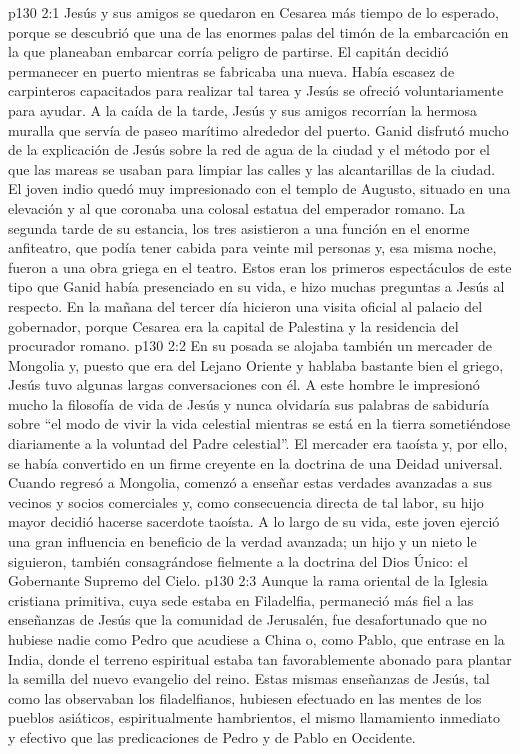 \vs p130 2:1 Jesús y sus amigos se quedaron en Cesarea más tiempo de lo esperado, porque se descubrió que una de las enormes palas del timón de la embarcación en la que planeaban embarcar corría peligro de partirse. El capitán decidió permanecer en puerto mientras se fabricaba una nueva. Había escasez de carpinteros capacitados para realizar tal tarea y Jesús se ofreció voluntariamente para ayudar. A la caída de la tarde, Jesús y sus amigos recorrían la hermosa muralla que servía de paseo marítimo alrededor del puerto. Ganid disfrutó mucho de la explicación de Jesús sobre la red de agua de la ciudad y el método por el que las mareas se usaban para limpiar las calles y las alcantarillas de la ciudad. El joven indio quedó muy impresionado con el templo de Augusto, situado en una elevación y al que coronaba una colosal estatua del emperador romano. La segunda tarde de su estancia, los tres asistieron a una función en el enorme anfiteatro, que podía tener cabida para veinte mil personas y, esa misma noche, fueron a una obra griega en el teatro. Estos eran los primeros espectáculos de este tipo que Ganid había presenciado en su vida, e hizo muchas preguntas a Jesús al respecto. En la mañana del tercer día hicieron una visita oficial al palacio del gobernador, porque Cesarea era la capital de Palestina y la residencia del procurador romano.
\vs p130 2:2 \pc En su posada se alojaba también un mercader de Mongolia y, puesto que era del Lejano Oriente y hablaba bastante bien el griego, Jesús tuvo algunas largas conversaciones con él. A este hombre le impresionó mucho la filosofía de vida de Jesús y nunca olvidaría sus palabras de sabiduría sobre “el modo de vivir la vida celestial mientras se está en la tierra sometiéndose diariamente a la voluntad del Padre celestial”. El mercader era taoísta y, por ello, se había convertido en un firme creyente en la doctrina de una Deidad universal. Cuando regresó a Mongolia, comenzó a enseñar estas verdades avanzadas a sus vecinos y socios comerciales y, como consecuencia directa de tal labor, su hijo mayor decidió hacerse sacerdote taoísta. A lo largo de su vida, este joven ejerció una gran influencia en beneficio de la verdad avanzada; un hijo y un nieto le siguieron, también consagrándose fielmente a la doctrina del Dios Único: el Gobernante Supremo del Cielo.
\vs p130 2:3 Aunque la rama oriental de la Iglesia cristiana primitiva, cuya sede estaba en Filadelfia, permaneció más fiel a las enseñanzas de Jesús que la comunidad de Jerusalén, fue desafortunado que no hubiese nadie como Pedro que acudiese a China o, como Pablo, que entrase en la India, donde el terreno espiritual estaba tan favorablemente abonado para plantar la semilla del nuevo evangelio del reino. Estas mismas enseñanzas de Jesús, tal como las observaban los filadelfianos, hubiesen efectuado en las mentes de los pueblos asiáticos, espiritualmente hambrientos, el mismo llamamiento inmediato y efectivo que las predicaciones de Pedro y de Pablo en Occidente.
